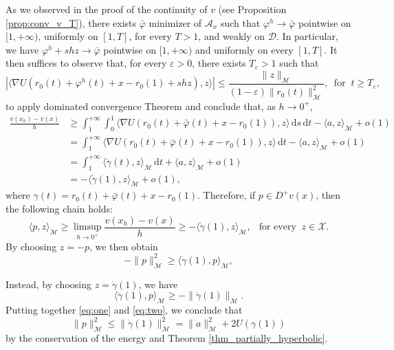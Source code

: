 \documentclass[a4paper,10pt]{amsart}
\newcommand{\ud}{\mathrm{d}}
\theoremstyle{plain}
\theoremstyle{definition}
\numberwithin{equation}{section}
\numberwithin{thm}{section}
\begin{document}
As we observed in the proof of the continuity of $v$ (see Proposition \ref{prop:conv_v_T}), there exists $\bar\varphi$ minimizer of $\mathcal{A}_x$ such that $\varphi^h \to \bar \varphi$ pointwise on $[1,+\infty)$, uniformly on $[1,T]$, for every $T>1$, and weakly on $\mathcal{D}$. In particular, we have $\varphi^h +shz \to \bar \varphi$ pointwise on $[1,+\infty)$ and uniformly on every $[1,T]$. It then suffices to observe that, for every $\varepsilon>0$,  there exists $T_\varepsilon>1$ such that
\[
\left|\langle \nabla U(r_0(t)+\varphi^h(t)+x-r_0(1)+shz),z\rangle\right| \le \frac{\|z\|_\mathcal{M}}{(1-\varepsilon)\|r_0(t)\|_\mathcal{M}^2}, \ \mbox{ for } \ t \ge T_\varepsilon,
\]
to apply dominated convergence Theorem and conclude that, as $h\to0^+$, 
\begin{equation} 
\label{eq:diff_v_1}
\begin{split} 
\frac{v(x_h)-v(x)}{h} &\ge \int_{1}^{+\infty} \int_0^1 \langle \nabla U(r_0(t)+\bar\varphi(t)+x-r_0(1)), z\rangle\,\ud s\,\ud t - \langle a,z \rangle_\mathcal{M} +o(1)
\\
&
=\int_{1}^{+\infty} \langle \nabla U(r_0(t)+\bar\varphi(t)+x-r_0(1)), z\rangle \,\ud t - \langle a,z \rangle_\mathcal{M} +o(1)
\\
&=\int_{1}^{+\infty} \langle \ddot \gamma(t), z\rangle_\mathcal{M}\,\ud t +\langle a,z\rangle_\mathcal{M} +o(1)
\\
&=-\langle \dot\gamma(1),z\rangle_\mathcal{M} +o(1),
\end{split}
\end{equation}
where $\gamma(t)=r_0(t)+\bar\varphi(t)+x-r_0(1)$. Therefore, if $p \in D^+v(x)$, then the following chain holds:
\[
\langle p,z\rangle_\mathcal{M}  \ge \limsup_{h \to 0^+} \frac{v(x_h)-v(x)}{h} \ge -\langle \dot \gamma(1), z\rangle_\mathcal{M}, \ \ \mbox{ for every } \ z \in \mathcal{X}.
\]
By choosing $z= -p$, we then obtain
\begin{equation}
    \label{eq:one}
-\|p\|_\mathcal{M}^2 \ge \langle \dot \gamma(1), p\rangle_\mathcal{M},
\end{equation}

Instead, by choosing $z= \dot \gamma(1)$, we have
\begin{equation} 
\label{eq:two}
\langle \dot \gamma(1),p\rangle_\mathcal{M} \ge -\|\dot \gamma(1)\|_\mathcal{M}.
\end{equation}
Putting together \eqref{eq:one} and \eqref{eq:two}, we conclude that
\begin{equation} 
\label{eq:three}
\|p\|_\mathcal{M}^2 \le \|\dot\gamma(1)\|_\mathcal{M}^2=\|a\|_\mathcal{M}^2+2U(\gamma(1))
\end{equation}
by the conservation of the energy and Theorem \ref{thm_partially_hyperbolic}.
\end{document}
